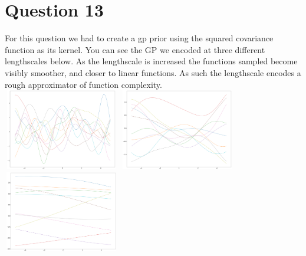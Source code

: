 \documentclass[a4paper, 9pt]{article}
\begin{document}
\section*{Question 13}
For this question we had to create a gp prior using the squared covariance function as its kernel. You can see the GP we encoded at three different lengthscales below. As the lengthscale is increased the functions sampled become visibly smoother, and closer to linear functions. As such the lengthscale encodes a rough approximator of function complexity.\\
\newline
\includegraphics[width=2in,height=1.4in]{lines1}
\includegraphics[width=2in,height=1.4in]{lines2} 
\includegraphics[width=2in,height=1.4in]{lines3} \\
\end{document}
